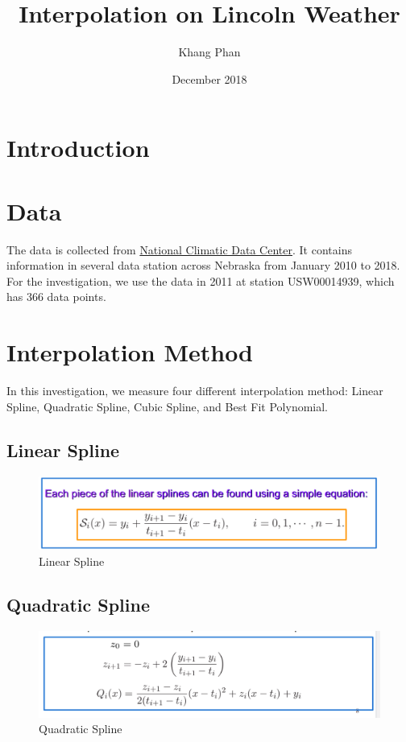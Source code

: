 \documentclass{article}
\title{Interpolation on Lincoln Weather}
\author{Khang Phan}
\date{December 2018}
\begin{document}
\maketitle
\clearpage

\tableofcontents
\listoffigures
\clearpage

\section{Introduction}
\section{Data}
The data is collected from \href{https://www.ncdc.noaa.gov/}{National Climatic Data Center}. It contains information in several data station across Nebraska from January 2010 to 2018. For the investigation, we use the data in 2011 at station USW00014939, which has 366 data points.
\section{Interpolation Method}
In this investigation, we measure four different interpolation method: Linear Spline, Quadratic Spline, Cubic Spline, and Best Fit Polynomial. 
\subsection{Linear Spline}
\begin{figure}[H]
    \centering
    \includegraphics[width=500pt]{Linear}
    \caption{Linear Spline}
    \label{fig:my_label}
\end{figure}
\subsection{Quadratic Spline}
\begin{figure}[H]
    \centering
    \includegraphics[width=500pt]{quadratic}
    \caption{Quadratic Spline}
    \label{fig:my_label}
\end{figure}
\end{document}
